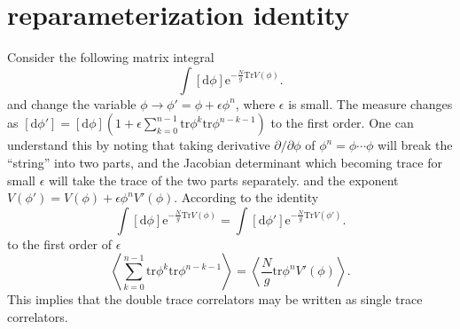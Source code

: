 \section{reparameterization identity}
Consider the following matrix integral
\begin{equation}
	\int [\mathrm{d}\phi] \mathrm{e}^{-\frac{N}{g}\mathrm{Tr}V(\phi)}
.\end{equation}
and change the variable $\phi\to\phi'=\phi+\epsilon\phi^n$, where $\epsilon$ is small.
The measure changes as $[\mathrm{d}\phi']=[\mathrm{d}\phi](1+\epsilon\sum_{k=0}^{n-1}\mathrm{tr}\phi^{k}\mathrm{tr}\phi^{n-k-1})$ to the first order.
One can understand this by noting that taking derivative $\partial/\partial\phi$ of $\phi^n=\phi\cdots\phi$ will break the ``string'' into two parts, and the Jacobian determinant which becoming trace for small $\epsilon$ will take the trace of the two parts separately.
and the exponent $V(\phi')=V(\phi)+\epsilon \phi^nV'(\phi)$.
According to the identity
\[
\int [\mathrm{d}\phi] \mathrm{e}^{-\frac{N}{g}\mathrm{Tr}V(\phi)} = \int [\mathrm{d}\phi'] \mathrm{e}^{-\frac{N}{g}\mathrm{Tr}V(\phi')}
.\]
to the first order of $\epsilon$
\begin{equation}
	\left\langle \sum_{k=0}^{n-1} \mathrm{tr}\phi^k \mathrm{tr}\phi^{n-k-1} \right\rangle = \left\langle \frac{N}{g}\mathrm{tr} \phi^n V'(\phi) \right\rangle
.\end{equation}
This implies that the double trace correlators may be written as single trace correlators.
